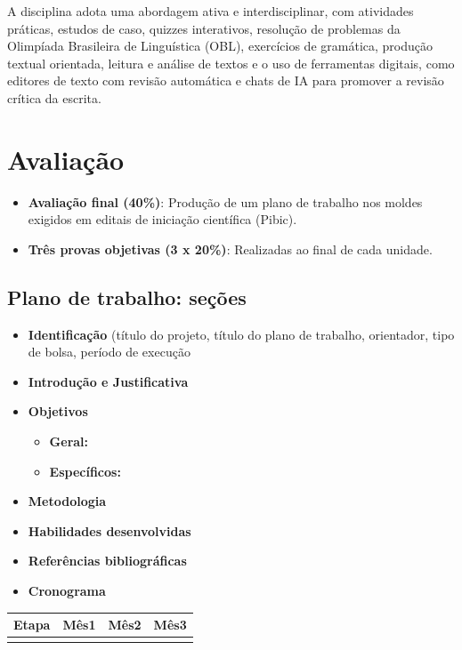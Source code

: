 \documentclass[
]{book}
\providecommand{\tightlist}{%
  \setlength{\itemsep}{0pt}\setlength{\parskip}{0pt}}
\begin{document}
A disciplina adota uma abordagem ativa e interdisciplinar, com atividades práticas, estudos de caso, quizzes interativos, resolução de problemas da Olimpíada Brasileira de Linguística (OBL), exercícios de gramática, produção textual orientada, leitura e análise de textos e o uso de ferramentas digitais, como editores de texto com revisão automática e chats de IA para promover a revisão crítica da escrita.

\section{Avaliação}\label{avaliauxe7uxe3o}

\begin{itemize}
\tightlist
\item
  \textbf{Avaliação final (40\%)}: Produção de um plano de trabalho nos moldes exigidos em editais de iniciação científica (Pibic).
\item
  \textbf{Três provas objetivas (3 x 20\%)}: Realizadas ao final de cada unidade.
\end{itemize}

\subsection{Plano de trabalho: seções}\label{plano-de-trabalho-seuxe7uxf5es}

\begin{itemize}
\item
  \textbf{Identificação} (título do projeto, título do plano de trabalho, orientador, tipo de bolsa, período de execução
\item
  \textbf{Introdução e Justificativa}
\item
  \textbf{Objetivos}

  \begin{itemize}
  \tightlist
  \item
    \textbf{Geral:}
  \item
    \textbf{Específicos:}
  \end{itemize}
\item
  \textbf{Metodologia}
\item
  \textbf{Habilidades desenvolvidas}
\item
  \textbf{Referências bibliográficas}
\item
  \textbf{Cronograma}
\end{itemize}

\begin{longtable}[]{@{}lccc@{}}
\toprule\noalign{}
Etapa & Mês1 & Mês2 & Mês3 \\
\midrule\noalign{}
\endhead
\bottomrule\noalign{}
\endlastfoot
\end{longtable}
\end{document}
